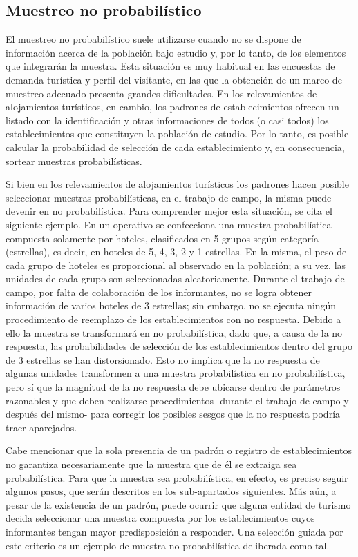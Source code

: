 \documentclass[
]{book}
\begin{document}
\hypertarget{muestreo-no-probabiluxedstico}{%
\subsection{Muestreo no probabilístico}\label{muestreo-no-probabiluxedstico}}

El muestreo no probabilístico suele utilizarse cuando no se dispone de información acerca de la población bajo estudio y, por lo tanto, de los elementos que integrarán la muestra. Esta situación es muy habitual en las encuestas de demanda turística y perfil del visitante, en las que la obtención de un marco de muestreo adecuado presenta grandes dificultades. En los relevamientos de alojamientos turísticos, en cambio, los padrones de establecimientos ofrecen un listado con la identificación y otras informaciones de todos (o casi todos) los establecimientos que constituyen la población de estudio. Por lo tanto, es posible calcular la probabilidad de selección de cada establecimiento y, en consecuencia, sortear muestras probabilísticas.

Si bien en los relevamientos de alojamientos turísticos los padrones hacen posible seleccionar muestras probabilísticas, en el trabajo de campo, la misma puede devenir en no probabilística. Para comprender mejor esta situación, se cita el siguiente ejemplo. En un operativo se confecciona una muestra probabilística compuesta solamente por hoteles, clasificados en 5 grupos según categoría (estrellas), es decir, en hoteles de 5, 4, 3, 2 y 1 estrellas. En la misma, el peso de cada grupo de hoteles es proporcional al observado en la población; a su vez, las unidades de cada grupo son seleccionadas aleatoriamente. Durante el trabajo de campo, por falta de colaboración de los informantes, no se logra obtener información de varios hoteles de 3 estrellas; sin embargo, no se ejecuta ningún procedimiento de reemplazo de los establecimientos con no respuesta. Debido a ello la muestra se transformará en no probabilística, dado que, a causa de la no respuesta, las probabilidades de selección de los establecimientos dentro del grupo de 3 estrellas se han distorsionado. Esto no implica que la no respuesta de algunas unidades transformen a una muestra probabilística en no probabilística, pero sí que la magnitud de la no respuesta debe ubicarse dentro de parámetros razonables y que deben realizarse procedimientos -durante el trabajo de campo y después del mismo- para corregir los posibles sesgos que la no respuesta podría traer aparejados.

Cabe mencionar que la sola presencia de un padrón o registro de establecimientos no garantiza necesariamente que la muestra que de él se extraiga sea probabilística. Para que la muestra sea probabilística, en efecto, es preciso seguir algunos pasos, que serán descritos en los sub-apartados siguientes. Más aún, a pesar de la existencia de un padrón, puede ocurrir que alguna entidad de turismo decida seleccionar una muestra compuesta por los establecimientos cuyos informantes tengan mayor predisposición a responder. Una selección guiada por este criterio es un ejemplo de muestra no probabilística deliberada como tal.
\end{document}
